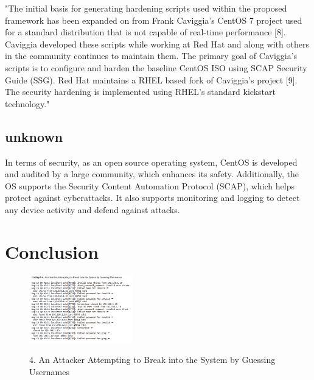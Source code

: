 \documentclass[10pt]{article}
\begin{document}
"The initial basis for generating hardening scripts used within the proposed framework
has been expanded on from Frank Caviggia’s CentOS 7 project used for a standard 
distribution that is not capable of real-time performance [8]. Caviggia developed these 
scripts while working at Red Hat and along with others in the community continues to 
maintain them. The primary goal of Caviggia’s scripts is to configure and harden the 
baseline CentOS ISO using SCAP Security Guide (SSG). Red Hat maintains a RHEL 
based fork of Caviggia’s project [9]. The security hardening is implemented using 
RHEL’s standard kickstart technology."
\cite{ALSHHfRtAR_SCAP_C}


\cite{SEiRHEL}
\subsection{unknown}
In terms of security, as an open source operating system, CentOS is developed and audited by a large community, which enhances its safety. Additionally, the OS supports the Security Content Automation Protocol (SCAP), which helps protect against cyberattacks. It also supports monitoring and logging to detect any device activity and defend against attacks.
\section{Conclusion}

\begin{figure}[!htbp]
    \centering
    \includegraphics[width=0.4\textwidth]{./research_example/Screenshot 2023-04-14 122536.png}
    \begin{description}
        \item[] 
    \end{description}
    \caption{4. An Attacker Attempting to Break into the System by Guessing Usernames }
    \label{fig:description}
\end{figure}
\printbibliography
\end{document}

